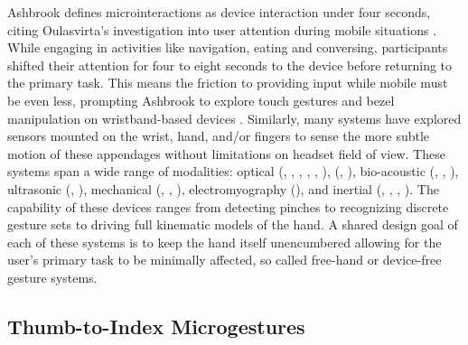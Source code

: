 \documentclass [11pt, proquest] {uwthesis}[2020/02/24]
\begin{document}
Ashbrook \cite{ashbrook2010enabling} defines microinteractions as device interaction under four seconds, citing Oulasvirta's investigation into user attention during mobile situations \cite{oulasvirta2005interaction}. While engaging in activities like navigation, eating and conversing, participants shifted their attention for four to eight seconds to the device before returning to the primary task. This means the friction to providing input while mobile must be even less, prompting Ashbrook to explore touch gestures and bezel manipulation on wristband-based devices \cite{ashbrook2008investigation, ashbrook2011nenya}. Similarly, many systems have explored sensors mounted on the wrist, hand, and/or fingers to sense the more subtle motion of these appendages without limitations on headset field of view. These systems span a wide range of modalities: {optical (\cite{Chatterjee2016TouchPoint:Device}, \cite{Kim2012Digits}, \cite{rekimoto2001gesturewrist},
\cite{McIntosh2017SensIR:Reflection}, \cite{Chan2015Cyclopsring:Ring},  \cite{loclair2010pinchwatch}), (\cite{Gong2017Pyro:Sensing}, \cite{thermalring}), bio-acoustic (\cite{10.1145/506443.506566}, \cite{sot}, \cite{fingerping}), 
ultrasonic (\cite{Iravantchi2019BeamBand:Beamforming}, \cite{Zhang2017SoundTrak}), mechanical (\cite{Takada2019AFiber}, \cite{Lin2015BackHand:Hand}, \cite{10.5555/3298830.3298870}), electromyography (\cite{saponas2009enabling}),
and inertial (\cite{Guy}, \cite{Meier2021TaplD:Sensing}, \cite{Fukumoto1994FingeRing:Interface}, \cite{Liang2021DualRing}).}
The capability of these devices ranges from detecting pinches to recognizing discrete gesture sets to driving full kinematic models of the hand. A shared design goal of each of these systems is to keep the hand itself unencumbered allowing for the user's primary task to be minimally affected, so called free-hand or device-free gesture systems.

\subsection{Thumb-to-Index Microgestures}
\end{document}
